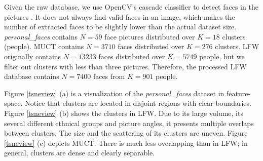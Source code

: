 \documentclass[conference]{IEEEtran}
\begin{document}
Given the raw database, we use OpenCV's cascade classifier to detect faces in the pictures \cite{b8}.
It does not always find valid faces in an image, which makes the number of extracted faces to be slightly lower than the actual dataset size.
\textit{personal\_faces} contains $N = 59$ face pictures distributed over $K = 18$ clusters (people).
MUCT contains $N = 3710$ faces distributed over $K = 276$ clusters.
LFW originally contains $N = 13233$ faces distributed over $K = 5749$ people, but we filter out clusters with less than three pictures.
Therefore, the processed LFW database contains $N = 7400$ faces from $K = 901$ people.

Figure \ref{tsneview} (a) is a visualization of the \textit{personal\_faces} dataset in feature-space.
Notice that clusters are located in disjoint regions with clear boundaries.
Figure \ref{tsneview} (b) shows the clusters in LFW.
Due to its large volume, its several different ethnical groups and picture angles, it presents multiple overlaps between clusters.
The size and the scattering of its clusters are uneven.
Figure \ref{tsneview} (c) depicts MUCT.
There is much less overlapping than in LFW; in general, clusters are dense and clearly separable.
\end{document}
